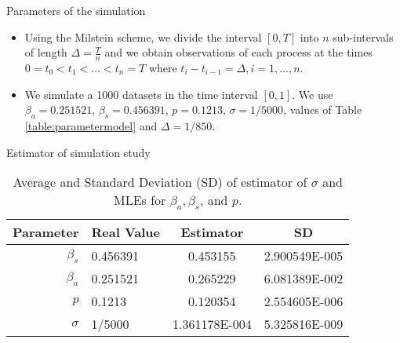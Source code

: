 \begin{frame}{Parameters of the simulation}
\begin{itemize}
\item Using the Milstein scheme, we divide the interval $[0,T]$ into $n$ sub-intervals of length 
$\Delta=\frac{T}{n}$ and we obtain observations of each process at the times 
$0=t_0<t_1<\ldots<t_n=T$ where $t_i-t_{i-1}=\Delta, i=1,\ldots,n$.
\item We simulate a 1000 datasets in the time interval $[0,1]$. 
    We use 
    $   \beta_a=0.251521
    $,
    $
        \beta_s=0.456391
    $,
    $
        p=0.1213
    $,
    $
        \sigma=1/5000
    $, values of Table \ref{table:parametermodel} and $\Delta=1/850$.
      

\end{itemize}
\end{frame}

\begin{frame}{Estimator of simulation study}
    \begin{table}[tbh]
        \centering
        \begin{tabular}{rlcc}\hline
Parameter & Real Value & Estimator & SD \\ \hline 
             $\beta_s$ & 0.456391 & 0.453155 & 2.900549E-005\\
            $\beta_a$  & 0.251521 & 0.265229 & 6.081389E-002  \\
    $p$ & 0.1213&0.120354 & 2.554605E-006\\          
    $\sigma$ & 1/5000 & 1.361178E-004 & 5.325816E-009\\
            \hline
        \end{tabular}
        \caption{Average and  Standard Deviation (SD) of estimator of $\sigma$ and MLEs for $\beta_a,\beta_s$, and $p$.}
        \label{table:MLE}
    \end{table}

    \end{frame}
